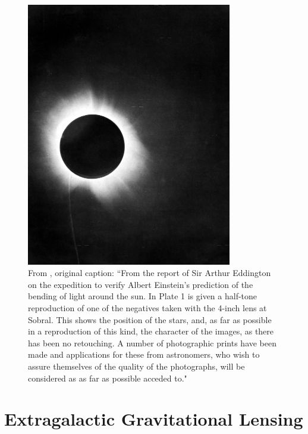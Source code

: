 \begin{figure}
\centering
\includegraphics[width=0.8\textwidth]{Intro/1919_eclipse_positive.jpg}
\caption[Photometric plates from the 1919 solar eclipse]{From \citet{Dyson:1920zl}, original caption: ``From the report of Sir Arthur Eddington on the expedition to verify Albert Einstein's prediction of the bending of light around the sun. In Plate 1 is given a half-tone reproduction of one of the negatives taken with the 4-inch lens at Sobral. This shows the position of the stars, and, as far as possible in a reproduction of this kind, the character of the images, as there has been no retouching. A number of photographic prints have been made and applications for these from astronomers, who wish to assure themselves of the quality of the photographs, will be considered as as far as possible acceded to."}
\label{intro:fig:eclipse}
\end{figure}


\section{Extragalactic Gravitational Lensing}

